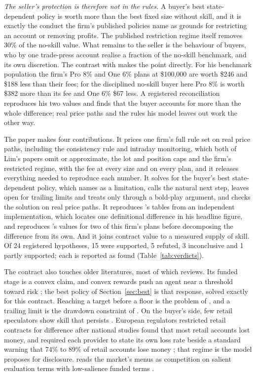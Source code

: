 \documentclass[11pt]{article}
\begin{document}
\emph{The seller's protection is therefore not in the rules.} A buyer's best state-dependent policy is worth
\GainBestCoin{} more than the best fixed size without skill, and it is exactly the conduct the firm's published
policies name as grounds for restricting an account or removing profits. The published restriction regime itself
removes 30\% of the no-skill value. What remains to the seller is the behaviour of buyers, who by one trade-press
account realise a fraction of the no-skill benchmark, and its own discretion. The contrast with \citet{lim2026b}
makes the point directly. For his benchmark population the firm's Pro 8\% and One 6\% plans at \$100,000 are worth
\$246 and \$188 less than their fees; for the disciplined no-skill buyer here Pro 8\% is worth \$382 more than its
fee and One 6\% \$67 less. A registered reconciliation reproduces his two values and finds that the buyer accounts
for more than the whole difference; real price paths and the rules his model leaves out work the other way.

The paper makes four contributions. It prices one firm's full rule set on real price paths, including the
consistency rule and intraday monitoring, which both of Lim's papers omit or approximate, the lot and position caps
and the firm's restricted regime, with the fee at every size and on every plan, and it releases everything needed
to reproduce each number. It solves for the buyer's best state-dependent policy, which \citet{lim2026} names as a
limitation, \citet{lim2026b} calls the natural next step, \citet{ruether2026} leaves open for trailing limits and
\citet{villahermosa2026} treats only through a bold-play argument, and checks the solution on real price paths. It reproduces \citet{lim2026}'s tables from an independent implementation, which locates one
definitional difference in his headline figure, and reproduces \citet{lim2026b}'s values for two of this firm's
plans before decomposing the difference from its own. And it joins contract value to a measured supply of skill.
Of 24 registered hypotheses, 15 were supported, 5 refuted, 3 inconclusive and 1 partly supported; each is reported
as found
(Table~\ref{tab:verdicts}).

The contract also touches older literatures, most of which \citet{lim2026b} reviews. Its funded stage is a convex
claim, and convex rewards push an agent near a threshold toward risk \citep{brown1996,carpenter2000}; the best
policy of Section~\ref{sec:best} is that response, solved exactly for this contract. Reaching a target before a
floor is the problem of \citet{browne1999}, and a trailing limit is the drawdown constraint of
\citet{grossman1993}. On the buyer's side, few retail speculators show skill that persists \citep{barber2014}.
European regulators restricted retail contracts for difference after national studies found that most retail
accounts lost money, and required each provider to state its own loss rate beside a standard warning that 74\% to
89\% of retail accounts lose money \citep{esma2018}; that regime is the model \citet{lim2026} proposes for
disclosure. \citet{lim2026b} reads the market's menus as competition on salient evaluation terms with low-salience
funded terms \citep{gabaix2006}.
\end{document}
